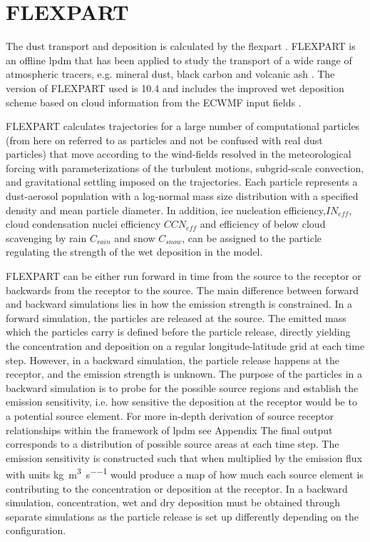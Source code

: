 \section{FLEXPART}
\par The dust transport and deposition is calculated by the \acrfull{flexpart} \parencite{Flexpart10.4_ref}. FLEXPART is an offline \acrshort{lpdm} that has been applied to study the transport of a wide range of atmospheric tracers, e.g. mineral dust, black carbon and volcanic ash \parencite{flexdust_ref_2016,choi_investigation_2020, eckhardt2008estimation}. 
The version of FLEXPART used is 10.4 and includes the improved wet deposition scheme based on cloud information from the ECWMF input fields \parencite{flexpart_wetdep}. 
\par FLEXPART calculates trajectories for a large number of computational particles (from here on referred to as particles and not be confused with real dust particles) that move according to the wind-fields resolved in the meteorological forcing with parameterizations of the turbulent motions, subgrid-scale convection, and gravitational settling imposed on the trajectories. 
Each particle represents a dust-aerosol population with a log-normal mass size distribution with a specified density and mean particle diameter. 
In addition, ice nucleation efficiency,$IN_{eff}$, cloud condensation nuclei efficiency $CCN_{eff}$ and efficiency of below cloud scavenging by rain $C_{rain}$ and snow $C_{snow}$, can be assigned to the particle regulating the strength of the wet deposition in the model.   

FLEXPART can be either run forward in time from the source to the receptor or backwards from the receptor to the source. The main difference between forward and backward simulations lies in how the emission strength is constrained. 
In a forward simulation, the particles are released at the source. 
The emitted mass which the particles carry is defined before the particle release, directly yielding the concentration and deposition on a regular longitude-latitude grid at each time step.
However, in a backward simulation, the particle release happens at the receptor, and the emission strength is unknown. 
The purpose of the particles in a backward simulation is to probe for the possible source regions and establish the emission sensitivity, i.e. how sensitive the deposition at the receptor would be to a potential source element. 
For more in-depth derivation of source receptor relationships within the framework of \acrshort{lpdm} see Appendix  The final output corresponds to a distribution of possible source areas at each time step.
The emission sensitivity is constructed such that when multiplied by the emission flux with units \si{\kg\per\cubic\metre\per\s} would produce a map of how much each source element is contributing to the concentration or deposition at the receptor.
In a backward simulation, concentration, wet and dry deposition must be obtained through separate simulations as the particle release is set up differently depending on the configuration.  
